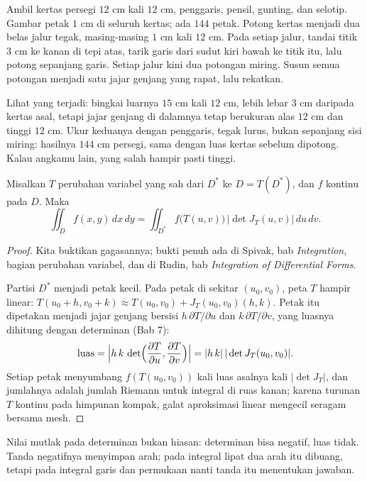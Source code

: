 \begin{tangan}
Ambil kertas persegi $12$ cm kali $12$ cm, penggaris, pensil, gunting, dan
selotip. Gambar petak $1$ cm di seluruh kertas; ada $144$ petak. Potong kertas
menjadi dua belas jalur tegak, masing-masing $1$ cm kali $12$ cm. Pada setiap
jalur, tandai titik $3$ cm ke kanan di tepi atas, tarik garis dari sudut kiri
bawah ke titik itu, lalu potong sepanjang garis. Setiap jalur kini dua potongan
miring. Susun semua potongan menjadi satu jajar genjang yang rapat, lalu
rekatkan.

Lihat yang terjadi: bingkai luarnya $15$ cm kali $12$ cm, lebih lebar $3$ cm
daripada kertas asal, tetapi jajar genjang di dalamnya tetap berukuran alas
$12$ cm dan tinggi $12$ cm. Ukur keduanya dengan penggaris, tegak lurus, bukan
sepanjang sisi miring: hasilnya $144$ cm persegi, sama dengan luas kertas
sebelum dipotong. Kalau angkamu lain, yang salah hampir pasti tinggi.
\end{tangan}

\begin{teorema}
 Misalkan $T$ perubahan variabel yang sah
dari $D^{*}$ ke $D=T(D^{*})$, dan $f$ kontinu pada $D$. Maka
\[
\iint_{D}f(x,y)\,dx\,dy
=\iint_{D^{*}} f\bigl(T(u,v)\bigr)\,\bigl|\det J_{T}(u,v)\bigr|\,du\,dv .
\]
\end{teorema}

\begin{proof}
Kita buktikan gagasannya; bukti penuh ada di Spivak, bab \emph{Integration},
bagian perubahan variabel, dan di Rudin, bab \emph{Integration of Differential
Forms}.

Partisi $D^{*}$ menjadi petak kecil. Pada petak di sekitar $(u_{0},v_{0})$,
peta $T$ hampir linear: $T(u_{0}+h,v_{0}+k)\approx
T(u_{0},v_{0})+J_{T}(u_{0},v_{0})(h,k)$. Petak itu dipetakan menjadi jajar
genjang bersisi $h\,\partial T/\partial u$ dan $k\,\partial T/\partial v$,
yang luasnya dihitung dengan determinan (Bab 7):
\[
\mathrm{luas}
=\Bigl|h\,k\,\det\Bigl(\frac{\partial T}{\partial u},
\frac{\partial T}{\partial v}\Bigr)\Bigr|
=|h\,k|\,|\det J_{T}(u_{0},v_{0})| .
\]
Setiap petak menyumbang $f(T(u_{0},v_{0}))$ kali luas asalnya kali
$|\det J_{T}|$, dan jumlahnya adalah jumlah Riemann untuk integral di ruas
kanan; karena turunan $T$ kontinu pada himpunan kompak, galat aproksimasi linear
mengecil seragam bersama mesh.
\end{proof}

Nilai mutlak pada determinan bukan hiasan: determinan bisa negatif, luas tidak.
Tanda negatifnya menyimpan arah; pada integral lipat dua arah itu dibuang, tetapi
pada integral garis dan permukaan nanti tanda itu menentukan jawaban.

